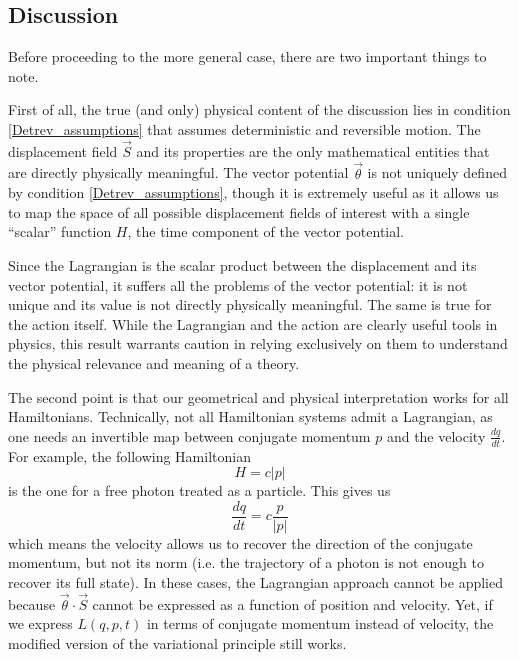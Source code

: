 \documentclass[10pt,twocolumn, nofootinbib]{revtex4-2}
\begin{document}
\subsection{Discussion}

Before proceeding to the more general case, there are two important things to note.

First of all, the true (and only) physical content of the discussion lies in condition \ref{Detrev_assumptions} that assumes deterministic and reversible motion. The displacement field $\vec{S}$ and its properties are the only mathematical entities that are directly physically meaningful. The vector potential $\vec{\theta}$ is not uniquely defined by condition \ref{Detrev_assumptions}, though it is extremely useful as it allows us to map the space of all possible displacement fields of interest with a single ``scalar'' function $H$, the time component of the vector potential.

Since the Lagrangian is the scalar product between the displacement and its vector potential, it suffers all the problems of the vector potential: it is not unique and its value is not directly physically meaningful. The same is true for the action itself. While the Lagrangian and the action are clearly useful tools in physics, this result warrants caution in relying exclusively on them to understand the physical relevance and meaning of a theory.

The second point is that our geometrical and physical interpretation works for all Hamiltonians. Technically, not all Hamiltonian systems admit a Lagrangian, as one needs an invertible map between conjugate momentum $p$ and the velocity $\frac{dq}{dt}$. For example, the following Hamiltonian
\begin{equation}
	H = c |p|
\end{equation}
is the one for a free photon treated as a particle. This gives us
\begin{equation}
	\frac{dq}{dt}= c \frac{p}{|p|}
\end{equation}
which means the velocity allows us to recover the direction of the conjugate momentum, but not its norm (i.e. the trajectory of a photon is not enough to recover its full state). In these cases, the Lagrangian approach cannot be applied because $\vec{\theta} \cdot \vec{S}$ cannot be expressed as a function of position and velocity. Yet, if we express $L(q,p,t)$ in terms of conjugate momentum instead of velocity, the modified version of the variational principle still works.
\end{document}
